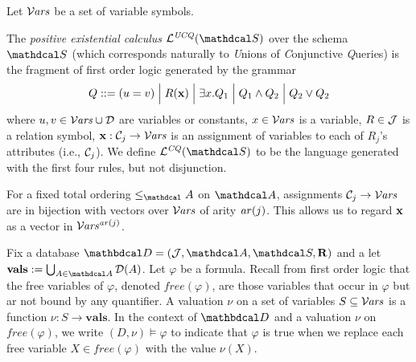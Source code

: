 \documentclass[the-pdg-manual.tex]{subfiles}
\begin{document}
Let $\mathcal V\kern-.65pt\mathit{ars}$ be a set of variable symbols.

\begin{defn}[CQ,UCQ]
	The \emph{positive existential calculus} $\lang{UCQ}(\Sch)$ over the schema $\Sch$ (which corresponds naturally to \emph Unions of \emph Conjunctive \emph Queries) is the fragment of first order logic generated by the grammar
	\begin{align*}
		 Q ::= (u=v) \mathrel{\Big|} R(\mathbf x)  \mathrel{\Big|} \exists x. Q_1 \mathrel{\Big|} Q_1 \land Q_2 \mathrel{\Big|} Q_2 \lor Q_2
	\end{align*}
	where $u,v \in \mathcal V\kern-.65pt\mathit{ars} \cup {\mathcal D}$ are variables
	or constants, $x \in \mathcal V\kern-.65pt\mathit{ars}$ is a variable,
	$R \in \mathcal J$ is a relation symbol, $\mathbf x  : \mathcal C_j \to {\mathcal V\kern-.65pt\mathit{ars}}$ is an assignment of variables to each of $R_j$'s attributes (i.e., $\mathcal C_j$). We define $\lang{CQ}(\Sch)$ to be the language generated with the first four rules, but not disjunction.
\end{defn}


\begin{inactive}
	For a fixed total ordering $\leq_\Attrs$ on $\Attrs$, assignments $\mathcal C_j \to \mathcal V\kern-.65pt\mathit{ars}$ are in bijection with vectors over $\mathcal V\kern-.65pt\mathit{ars}$ of arity $\mathit{ar}(j)$. This allows us to regard $\mathbf x$ as a vector in $\mathcal V\kern-.65pt\mathit{ars}^{\mathit{ar}(j)}$.
\end{inactive}
Fix a database $\D = (\Idx,\Attrs,\Sch,\Rels)$ and a let $\vals := \bigcup_{A \in \Attrs}\Doms(A)$. Let $\varphi$ be a formula.
Recall from first order logic that the free variables of $\varphi$, denoted $\mathit{free}(\varphi)$, are those variables that occur in $\varphi$ but ar not bound by any quantifier.
A valuation $\nu$ on a set of variables $S \subseteq \mathcal V\kern-.65pt\mathit{ars}$ is a function $\nu: S \to \mathbf{vals}$.
In the context of $\D$ and a valuation $\nu$ on $\mathit{free}(\varphi)$, we write $(D,\nu) \models \varphi$ to indicate that $\varphi$ is true when we replace each free variable $X \in \mathit{free}(\varphi)$ with the value $\nu(X)$. %
\end{document}
